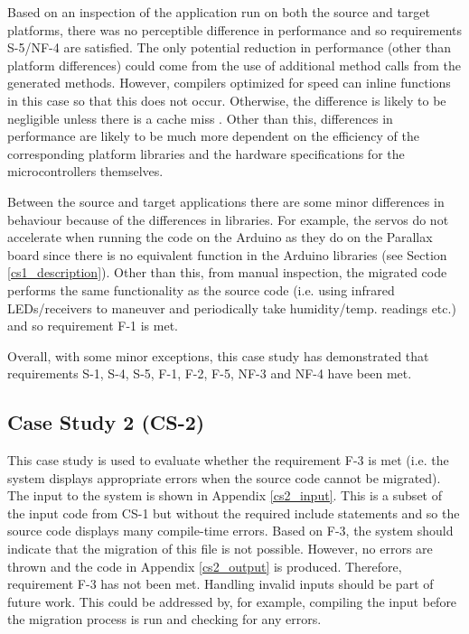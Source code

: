 \documentclass{UoYCSproject}
\begin{document}
Based on an inspection of the application run on both the source and target platforms, there was no perceptible difference in performance and so requirements S-5/NF-4 are satisfied. The only potential reduction in performance (other than platform differences) could come from the use of additional method calls from the generated methods. However, compilers optimized for speed can inline functions in this case so that this does not occur. Otherwise, the difference is likely to be negligible unless there is a cache miss \parencite{function_call_performance}. Other than this, differences in performance are likely to be much more dependent on the efficiency of the corresponding platform libraries and the hardware specifications for the microcontrollers themselves.

Between the source and target applications there are some minor differences in behaviour because of the differences in libraries. For example, the servos do not accelerate when running the code on the Arduino as they do on the Parallax board since there is no equivalent function in the Arduino libraries (see Section \ref{cs1_description}). Other than this, from manual inspection, the migrated code performs the same functionality as the source code (i.e. using infrared LEDs/receivers to maneuver and periodically take humidity/temp. readings etc.) and so requirement F-1 is met.

Overall, with some minor exceptions, this case study has demonstrated that requirements S-1, S-4, S-5, F-1, F-2, F-5, NF-3 and NF-4 have been met.

\subsection{Case Study 2 (CS-2)} \label{cs2}
This case study is used to evaluate whether the requirement F-3 is met (i.e. the system displays appropriate errors when the source code cannot be migrated). The input to the system is shown in Appendix \ref{cs2_input}. This is a subset of the input code from CS-1 but without the required include statements and so the source code displays many compile-time errors. Based on F-3, the system should indicate that the migration of this file is not possible. However, no errors are thrown and the code in Appendix \ref{cs2_output} is produced. Therefore, requirement F-3 has not been met. Handling invalid inputs should be part of future work. This could be addressed by, for example, compiling the input before the migration process is run and checking for any errors.
\end{document}

